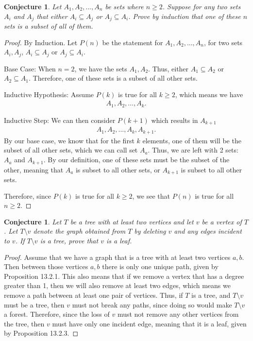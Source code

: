 \documentclass[11pt,titlepage]{article}		%
\newtheorem{conjecture}[theorem]{Conjecture}
\theoremstyle{definition}
\theoremstyle{theorem}
\begin{document}
\clearpage
\begin{conjecture}
Let $A_1,A_2,...,A_n$ be sets where $n \ge 2$. Suppose for any two sets $A_i$ and $A_j$ that either $A_i \subseteq A_j$ or $A_j \subseteq A_i$. Prove by induction that one of these $n$ sets is a subset of all of them.
\end{conjecture}
\begin{proof}
By Induction. Let $P(n)$ be the statement for $A_1,A_2,...,A_n$, for two sets $A_i,A_j$, $A_i \subseteq A_j$ or $A_j \subseteq A_i$.

Base Case: When $n = 2$, we have the sets $A_1, A_2$. Thus, either $A_1 \subseteq A_2$ or $A_2 \subseteq A_1$. Therefore, one of these sets is a subset of all other sets.

Inductive Hypothesis: Assume $P(k)$ is true for all $k \ge 2$, which means we have
\begin{align*}
A_1,A_2,...,A_k.
\end{align*}

Inductive Step: We can then consider $P(k+1)$ which results in $A_{k+1}$
\begin{align*}
A_1,A_2,...,A_k,A_{k+1}.
\end{align*}
By our base case, we know that for the first $k$ elements, one of them will be the subset of all other sets, which we can call set $A_a$. Thus, we are left with 2 sets: $A_a$ and $A_{k+1}$. By our definition, one of these sets must be the subset of the other, meaning that $A_a$ is subset to all other sets, or $A_{k+1}$ is subset to all other sets.

Therefore, since $P(k)$ is true for all $k \ge 2$, we see that $P(n)$ is true for all $n \ge 2$.

\end{proof}






\clearpage
\begin{conjecture}
    Let $T$ be a tree with at least two vertices and let $v$ be a vertex of $T$. Let $T \setminus v$ denote the graph obtained from $T$ by deleting $v$ and any edges incident to $v$. If $T \setminus v$ is a tree, prove that $v$ is a leaf.
\end{conjecture}
\begin{proof}
Assume that we have a graph that is a tree with at least two vertices $a,b$. Then between those vertices $a,b$ there is only one unique path, given by Proposition 13.2.1. This also means that if we remove a vertex that has a degree greater than 1, then we will also remove at least two edges, which means we remove a path between at least one pair of vertices. Thus, if $T$ is a tree, and $T\setminus v$ must be a tree, then $v$ must not break any paths, since doing so would make $T\setminus v$ a forest. Therefore, since the loss of $v$ must not remove any other vertices from the tree, then $v$ must have only one incident edge, meaning that it is a leaf, given by Proposition 13.2.3.
\end{proof}
\end{document}
